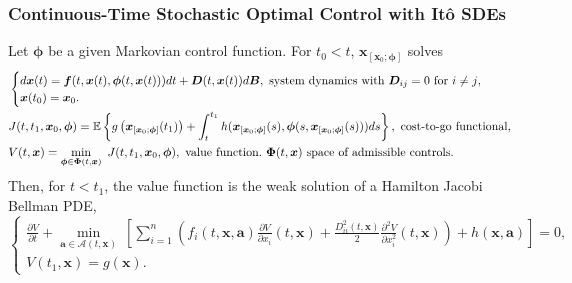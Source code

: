 
\begin{frame}
\frametitle{Continuous-Time Stochastic Optimal Control with It\^o SDEs} %
{\small
\begin{theorem} \label{T1}
Let  $\bm{\phi}$ be a given Markovian control function. For   $t_0<t$,  $\bm{x}_{[\bm{x}_0;\bm{\phi}]} $ solves
%
\begin{equation*}
\begin{aligned}
&\begin{cases}d\bm{x}(t) = \bm{f}(t,\bm{x}(t),\bm{\phi}(t,\bm{x}(t)))dt+\bm{D}(t,\bm{x}(t))d\bm{B},\ \text{system dynamics with $\bm{D}_{ij}=0$ for $i\neq j$},\\
\bm{x}(t_0)=\bm{x}_0.
\end{cases} \\
&J(t, t_1,\bm{x}_0,\bm{\phi})=\E\left\{g\left(\bm{x}_{[\bm{x}_0;\bm{\phi}]}(t_1)\right)+\int_{t}^{t_1}h(\bm{x}_{[\bm{x}_0;\bm{\phi}]}(s),\bm{\phi}(s,\bm{x}_{[\bm{x}_0;\bm{\phi}]}(s)))ds\right\},\ \text{cost-to-go functional},\\
&V(t,\bm{x})=\min_{\bm{\phi}\in\bm{\Phi}(t,\bm{x})}\ J(t,t_1,\bm{x}_0,\bm{\phi}),\ \text{value function}.\ \bm{\Phi}(t,\bm{x})\ \text{space of admissible controls}.
\end{aligned}
\end{equation*}
Then, for $t<t_1$, the value function is the weak solution of a Hamilton Jacobi Bellman PDE,
\begin{equation*}
\begin{cases}
\frac{\partial V}{\partial t}+\min_{\bm{a}\in \mathcal{A}(t,\bm{x})}\ \left[\sum_{i=1}^n\left(f_i(t,\bm{x},\bm{a})\frac{\partial V}{\partial x_i}(t,\bm{x})+\frac{D_{ii}^2(t,\bm{x})}{2}\frac{\partial^2V}{\partial x_i^2}(t,\bm{x})\right)+h(\bm{x},\bm{a})\right]=0,\\
V(t_1,\bm{x})=g(\bm{x}).
\end{cases}
\end{equation*}
\end{theorem}}

\end{frame}


